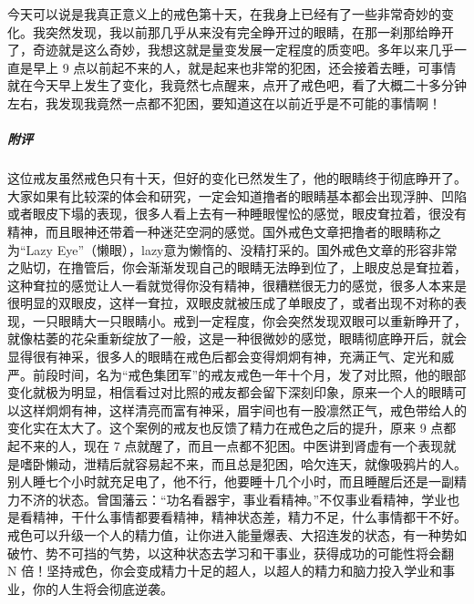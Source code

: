 \begin{case}
    今天可以说是我真正意义上的戒色第十天，在我身上已经有了一些非常奇妙的变化。我突然发现，我以前那几乎从来没有完全睁开过的眼睛，在那一刹那给睁开了，奇迹就是这么奇妙，我想这就是量变发展一定程度的质变吧。多年以来几乎一直是早上 9 点以前起不来的人，就是起来也非常的犯困，还会接着去睡，可事情就在今天早上发生了变化，我竟然七点醒来，点开了戒色吧，看了大概二十多分钟左右，我发现我竟然一点都不犯困，要知道这在以前近乎是不可能的事情啊！
    \subparagraph{附评} 这位戒友虽然戒色只有十天，但好的变化已然发生了，他的眼睛终于彻底睁开了。大家如果有比较深的体会和研究，一定会知道撸者的眼睛基本都会出现浮肿、凹陷或者眼皮下塌的表现，很多人看上去有一种睡眼惺忪的感觉，眼皮耷拉着，很没有精神，而且眼神还带着一种迷茫空洞的感觉。国外戒色文章把撸者的眼睛称之为“Lazy Eye”（懒眼），lazy意为懒惰的、没精打采的。国外戒色文章的形容非常之贴切，在撸管后，你会渐渐发现自己的眼睛无法睁到位了，上眼皮总是耷拉着，这种耷拉的感觉让人一看就觉得你没有精神，很糟糕很无力的感觉，很多人本来是很明显的双眼皮，这样一耷拉，双眼皮就被压成了单眼皮了，或者出现不对称的表现，一只眼睛大一只眼睛小。戒到一定程度，你会突然发现双眼可以重新睁开了，就像枯萎的花朵重新绽放了一般，这是一种很微妙的感觉，眼睛彻底睁开后，就会显得很有神采，很多人的眼睛在戒色后都会变得炯炯有神，充满正气、定光和威严。前段时间，名为“戒色集团军”的戒友戒色一年十个月，发了对比照，他的眼部变化就极为明显，相信看过对比照的戒友都会留下深刻印象，原来一个人的眼睛可以这样炯炯有神，这样清亮而富有神采，眉宇间也有一股凛然正气，戒色带给人的变化实在太大了。这个案例的戒友也反馈了精力在戒色之后的提升，原来 9 点都起不来的人，现在 7 点就醒了，而且一点都不犯困。中医讲到肾虚有一个表现就是嗜卧懒动，泄精后就容易起不来，而且总是犯困，哈欠连天，就像吸鸦片的人。别人睡七个小时就充足电了，他不行，他要睡十几个小时，而且睡醒后还是一副精力不济的状态。曾国藩云：“功名看器宇，事业看精神。”不仅事业看精神，学业也是看精神，干什么事情都要看精神，精神状态差，精力不足，什么事情都干不好。戒色可以升级一个人的精力值，让你进入能量爆表、大招连发的状态，有一种势如破竹、势不可挡的气势，以这种状态去学习和干事业，获得成功的可能性将会翻 N 倍！坚持戒色，你会变成精力十足的超人，以超人的精力和脑力投入学业和事业，你的人生将会彻底逆袭。
\end{case}

